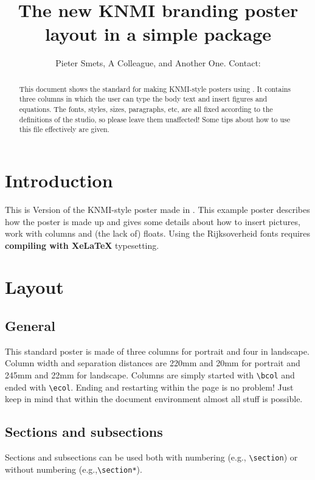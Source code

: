 \documentclass{article}
\title{The new KNMI branding poster layout in a simple \latex package}
\author{Pieter Smets\affil{1,2}, A Colleague\affil{1}, and Another One\affil{2}. Contact: \email{smets@knmi.nl}}
\begin{document}
\maketitle

\begin{abstract}
This document shows the standard for making KNMI-style posters using \latex. It contains three columns in which the user can type the body text and insert figures and equations. The fonts, styles, sizes, paragraphs, etc, are all fixed according to the definitions of the studio, so please leave them unaffected! Some tips about how to use this file effectively are given. %
\end{abstract}

\bcols %

\section*{Introduction}
This is Version \fileversion of the KNMI-style poster made in \latex. This example poster describes how the poster is made up and gives some details about how to insert pictures, work with columns and (the lack of) floats.
Using the Rijksoverheid fonts requires \textbf{compiling with XeLaTeX} typesetting.

\section*{Layout}
\subsection*{General}
This standard poster is made of three columns for portrait and four in landscape. Column width and separation distances are 220mm and 20mm for portrait and 245mm and 22mm for landscape. Columns are simply started with \verb|\bcol| and ended with \verb|\ecol|. Ending and restarting within the page is no problem!
Just keep in mind that within the document environment almost all \latex stuff is possible.

\subsection*{Sections and subsections}
Sections and subsections can be used both with numbering (e.g., \verb|\section|) or without numbering (e.g.,\verb|\section*|).
\end{document}

